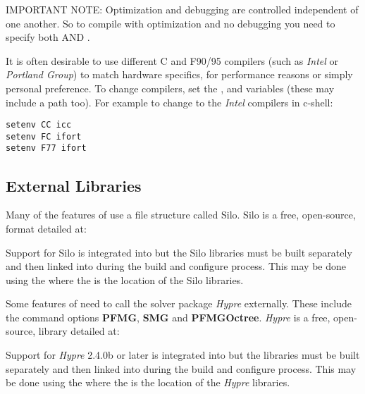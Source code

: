 \begin{enumerate}
IMPORTANT NOTE: Optimization and debugging are controlled independent of one
another.  So to compile with optimization and no debugging you need to
specify both  AND .

It is often desirable to use different C and F90/95 compilers 
(such as \emph{Intel} or \emph{Portland Group}) to match hardware specifics,
for performance reasons or simply personal preference.  To change compilers,
set the ,  and  variables (these may include a path too). 
For example to change to the \emph{Intel} compilers in c-shell:
\begin{display}\begin{verbatim}
setenv CC icc
setenv FC ifort
setenv F77 ifort
\end{verbatim}\end{display}
\end{enumerate}

\subsection{External Libraries}
\label{External Libraries}
Many of the features of \parflow{} use a file structure called Silo.  
Silo is a free, open-source, format detailed at:
\begin{center}
\end{center}
Support for Silo is integrated into \parflow{} but the Silo libraries 
must be built separately and then linked into \parflow{} during the 
build and configure process.   This may be done using the  
where the  is the location of the Silo libraries.

Some features of \parflow{} need to call the solver package \emph{Hypre} externally.  
These include the command options {\bf PFMG}, {\bf SMG} and  {\bf PFMGOctree}. \emph{Hypre} is a
free, open-source, library detailed at:
\begin{center}
\end{center}
Support for \emph{Hypre} 2.4.0b or later is integrated into \parflow{} but the libraries
must be built separately and then linked into \parflow{} during the build and configure process. 
This may be done using the  where the  is the location of the
\emph{Hypre} libraries.

